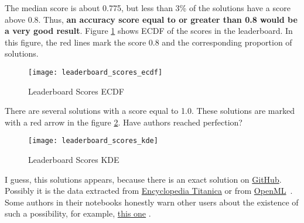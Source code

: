 The median score is about 0.775, but less than 3\% of the solutions have 
a score above 0.8. Thus, \textbf{an accuracy score equal to or greater 
than 0.8 would be a very good result}. Figure \ref{pic:leaderboard_scores_ecdf}
shows ECDF of the scores in the leaderboard. In this figure, the red 
lines mark the score 0.8 and the corresponding proportion of solutions.

\begin{figure}[!ht]
	\centering
	\texttt{[image: leaderboard\_scores\_ecdf]}
	\caption{Leaderboard Scores ECDF}
	\label{pic:leaderboard_scores_ecdf}
\end{figure}

There are several solutions with a score equal to 1.0. These solutions 
are marked with a red arrow in the figure \ref{pic:leaderboard_scores_kde}. 
Have authors reached perfection?

\begin{figure}[!ht]
	\centering
	\texttt{[image: leaderboard\_scores\_kde]}
	\caption{Leaderboard Scores KDE}
	\label{pic:leaderboard_scores_kde}
\end{figure}

I guess, this solutions appears, because there is an exact solution on
\href{https://github.com/thisisjasonjafari/my-datascientise-handcode/raw/master/005-datavisualization/titanic.csv}
{GitHub}. Possibly it is the data extracted from 
\href{https://www.encyclopedia-titanica.org/titanic-survivors/}
{Encyclopedia Titanica}\cite{encyclopedia_titanica} or from
\href{https://www.openml.org/search?type=data&sort=runs&id=40945&status=active}
{OpenML}~\cite{openml_titanic}. Some authors in their notebooks honestly warn 
other users about the existence of such a possibility, for example, 
\href{https://www.kaggle.com/code/suzukifelipe/how-to-be-a-top-lb-explained-for-beginners/notebook?scriptVersionId=99817039}{this one}
\cite{perfection_explanation}.


